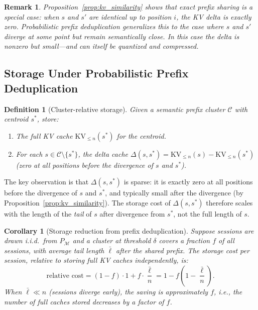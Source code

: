 \documentclass[11pt]{article}
\newtheorem{definition}{Definition}
\newtheorem{corollary}{Corollary}
\newtheorem{remark}{Remark}
\begin{document}
\begin{remark}
Proposition~\ref{prop:kv_similarity} shows that exact prefix sharing is a special
case: when $s$ and $s'$ are identical up to position $i$, the KV delta is exactly
zero.  Probabilistic prefix deduplication generalizes this to the case where $s$
and $s'$ diverge at some point but remain semantically close.  In this case the
delta is nonzero but small---and can itself be quantized and compressed.
\end{remark}

\subsection{Storage Under Probabilistic Prefix Deduplication}

\begin{definition}[Cluster-relative storage]
\label{def:cluster_storage}
Given a semantic prefix cluster $\mathcal{C}$ with centroid $s^*$, store:
\begin{enumerate}[leftmargin=2em]
  \item The full KV cache $\mathrm{KV}_{\leq n}(s^*)$ for the centroid.
  \item For each $s \in \mathcal{C} \setminus \{s^*\}$, the \emph{delta cache}
        $\Delta(s, s^*) = \mathrm{KV}_{\leq n}(s) - \mathrm{KV}_{\leq n}(s^*)$
        (zero at all positions before the divergence of $s$ and $s^*$).
\end{enumerate}
\end{definition}

The key observation is that $\Delta(s, s^*)$ is sparse: it is exactly zero at
all positions before the divergence of $s$ and $s^*$, and typically small after
the divergence (by Proposition~\ref{prop:kv_similarity}).  The storage cost of
$\Delta(s, s^*)$ therefore scales with the length of the \emph{tail} of $s$
after divergence from $s^*$, not the full length of $s$.

\begin{corollary}[Storage reduction from prefix deduplication]
\label{cor:prefix_storage}
Suppose sessions are drawn i.i.d.\ from $P_{\mathcal{M}}$ and a cluster at threshold
$\delta$ covers a fraction $f$ of all sessions, with average tail length $\bar{\ell}$
after the shared prefix.  The storage cost per session, relative to storing full
KV caches independently, is:
\[
  \text{relative cost} = (1 - f) \cdot 1 + f \cdot \frac{\bar{\ell}}{n} = 1 - f\left(1 - \frac{\bar{\ell}}{n}\right).
\]
When $\bar{\ell} \ll n$ (sessions diverge early), the saving is approximately $f$,
i.e., the number of full caches stored decreases by a factor of $f$.
\end{corollary}
\end{document}
